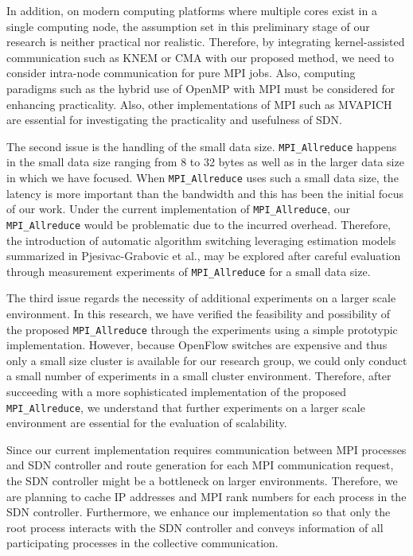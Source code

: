 In addition, on modern computing platforms where multiple cores exist in
a single computing node, the assumption set in this preliminary stage of
our research is neither practical nor realistic. Therefore, by
integrating kernel-assisted communication such as KNEM \cite{Goglin2013}
or CMA \cite{cma} with our proposed method, we need to consider
intra-node communication for pure MPI jobs. Also, computing paradigms
such as the hybrid use of OpenMP with MPI must be considered for
enhancing practicality. Also, other implementations of MPI such as
MVAPICH \cite{mvapich} are essential for investigating the practicality
and usefulness of SDN.

The second issue is the handling of the small data size.
\texttt{MPI\_Allreduce} happens in the small data size ranging from 8 to
32 bytes as well as in the larger data size in which we have focused.
When \texttt{MPI\_Allreduce} uses such a small data size, the latency is
more important than the bandwidth and this has been the initial focus of
our work. Under the current implementation of \texttt{MPI\_Allreduce},
our \texttt{MPI\_Allreduce} would be problematic due to the incurred
overhead. Therefore, the introduction of automatic algorithm switching
leveraging estimation models summarized in Pjesivac-Grabovic et al.,
\cite{PjesivacGrbovic} may be explored after careful evaluation through
measurement experiments of \texttt{MPI\_Allreduce} for a small data
size.

The third issue regards the necessity of additional experiments on a
larger scale environment. In this research, we have verified the
feasibility and possibility of the proposed \texttt{MPI\_Allreduce}
through the experiments using a simple prototypic implementation.
However, because OpenFlow switches are expensive and thus only a small
size cluster is available for our research group, we could only conduct
a small number of experiments in a small cluster environment. Therefore,
after succeeding with a more sophisticated implementation of the
proposed \texttt{MPI\_Allreduce}, we understand that further experiments
on a larger scale environment are essential for the evaluation of
scalability.

Since our current implementation requires communication between MPI
processes and SDN controller and route generation for each MPI
communication request, the SDN controller might be a bottleneck on
larger environments. Therefore, we are planning to cache IP addresses
and MPI rank numbers for each process in the SDN controller.
Furthermore, we enhance our implementation so that only the root process
interacts with the SDN controller and conveys information of all
participating processes in the collective communication.

